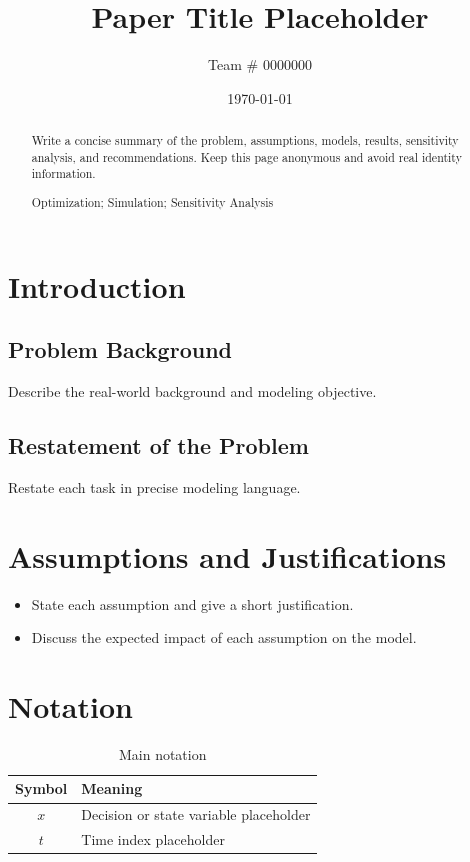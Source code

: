 \documentclass{mcmthesis}
\title{Paper Title Placeholder}
\author{Team \# 0000000}
\date{\today}
\begin{document}
\begin{abstract}
Write a concise summary of the problem, assumptions, models, results, sensitivity analysis, and recommendations. Keep this page anonymous and avoid real identity information.

\begin{keywords}
Optimization; Simulation; Sensitivity Analysis
\end{keywords}
\end{abstract}

\maketitle

\tableofcontents
\newpage

\section{Introduction}
\subsection{Problem Background}
Describe the real-world background and modeling objective.

\subsection{Restatement of the Problem}
Restate each task in precise modeling language.

\section{Assumptions and Justifications}
\begin{itemize}
  \item State each assumption and give a short justification.
  \item Discuss the expected impact of each assumption on the model.
\end{itemize}

\section{Notation}
\begin{table}[htbp]
  \centering
  \caption{Main notation}
  \begin{tabular}{cl}
    \toprule
    Symbol & Meaning \\
    \midrule
    $x$ & Decision or state variable placeholder \\
    $t$ & Time index placeholder \\
    \bottomrule
  \end{tabular}
\end{table}
\end{document}
